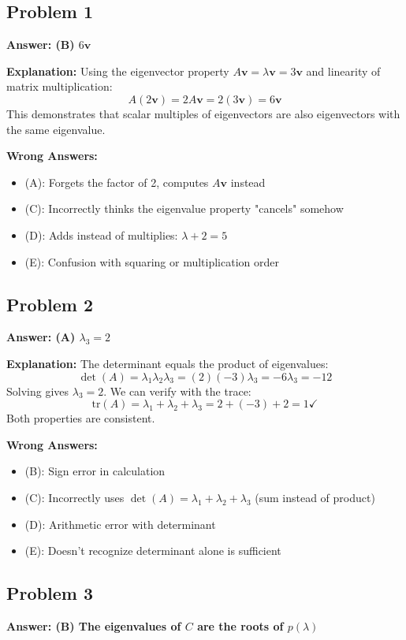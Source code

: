 \documentclass[12pt]{amsart}
\newcommand{\correct}[1]{{\color{correctgreen}\textbf{#1}}}
\begin{document}
\subsection*{Problem 1}
\correct{Answer: (B) $6\mathbf{v}$}

\textbf{Explanation:} Using the eigenvector property $A\mathbf{v} = \lambda\mathbf{v} = 3\mathbf{v}$ and linearity of matrix multiplication:
$$A(2\mathbf{v}) = 2A\mathbf{v} = 2(3\mathbf{v}) = 6\mathbf{v}$$
This demonstrates that scalar multiples of eigenvectors are also eigenvectors with the same eigenvalue.

\textbf{Wrong Answers:}
\begin{itemize}
\item (A): Forgets the factor of 2, computes $A\mathbf{v}$ instead
\item (C): Incorrectly thinks the eigenvalue property "cancels" somehow
\item (D): Adds instead of multiplies: $\lambda + 2 = 5$
\item (E): Confusion with squaring or multiplication order
\end{itemize}

\subsection*{Problem 2}
\correct{Answer: (A) $\lambda_3 = 2$}

\textbf{Explanation:} The determinant equals the product of eigenvalues:
$$\det(A) = \lambda_1 \lambda_2 \lambda_3 = (2)(-3)\lambda_3 = -6\lambda_3 = -12$$
Solving gives $\lambda_3 = 2$. We can verify with the trace:
$$\text{tr}(A) = \lambda_1 + \lambda_2 + \lambda_3 = 2 + (-3) + 2 = 1 \checkmark$$
Both properties are consistent.

\textbf{Wrong Answers:}
\begin{itemize}
\item (B): Sign error in calculation
\item (C): Incorrectly uses $\det(A) = \lambda_1 + \lambda_2 + \lambda_3$ (sum instead of product)
\item (D): Arithmetic error with determinant
\item (E): Doesn't recognize determinant alone is sufficient
\end{itemize}

\subsection*{Problem 3}
\correct{Answer: (B) The eigenvalues of $C$ are the roots of $p(\lambda)$}
\end{document}
